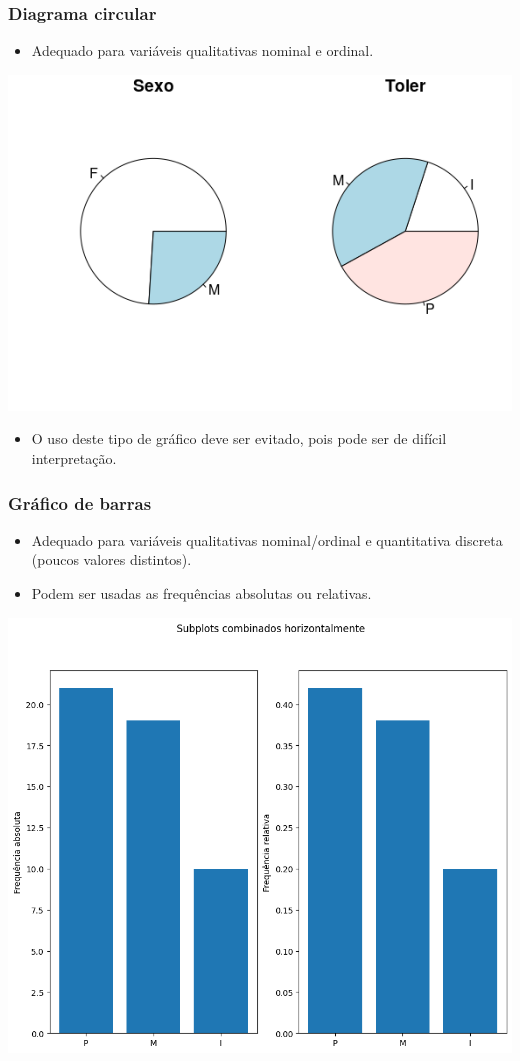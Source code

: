 \documentclass[11pt]{beamer}
\begin{document}
\begin{frame}
\frametitle{Diagrama circular}

\begin{itemize}
\item
  Adequado para variáveis qualitativas nominal e ordinal.
\end{itemize}


\begin{center}\includegraphics[width=0.7\linewidth]{figs/pie_chart} \end{center}


\begin{itemize}
\item
  O uso deste tipo de gráfico deve ser evitado, pois pode ser de difícil
  interpretação.
\end{itemize}
\end{frame}

\begin{frame}
\frametitle{Gráfico de barras}

\begin{itemize}
\item
  Adequado para variáveis qualitativas nominal/ordinal e quantitativa
  discreta (poucos valores distintos).
\item
  Podem ser usadas as frequências absolutas ou relativas.
\end{itemize}

\begin{center}\includegraphics[width=0.5\linewidth]{figs/bar_plot2.png} \end{center}
\end{frame}
\end{document}
